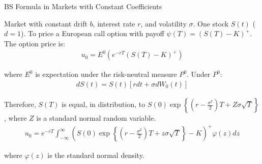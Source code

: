 \documentclass{beamer}
\begin{document}
\begin{frame}{BS Formula in Markets with Constant Coefficients}

    {\footnotesize \footnotesize
    \par  Market with constant drift \( b \), interest rate \( r \), and volatility $\sigma$. One stock \( S(t) \) (\( d = 1 \)). 
     To price a European call option with payoff $\psi(T) = (S(T) - K)^+. $ The option price is:
     \begin{align*}
        u_0 = E^0 \left( e^{-rT} (S(T) - K)^+\right)
     \end{align*}
     \par where \( E^0 \) is expectation under the risk-neutral measure \( P^0 \). Under \( P^0 \):
     \begin{align*}
        dS(t) = S(t)[rdt + \sigma dW_0(t)]
     \end{align*}
     \par Therefore, \( S(T) \) is equal, in distribution,
      to \( S(0) \exp \left\{ \left( r - \frac{\sigma^2}{2} \right) T + Z\sigma\sqrt{T} \right\} \), 
     where \( Z \) is a standard normal random variable.
     \begin{align*}
        u_0 = e^{-rT} \int_{-\infty}^{\infty} \left( S(0) \exp \left\{ \left( r - \frac{\sigma^2}{2} \right) T 
        + z\sigma\sqrt{T} \right\} - K \right)^+ \varphi(z) dz
     \end{align*}
     \par where \( \varphi(z) \) is the standard normal density.
    }
    
\end{frame}
\end{document}
